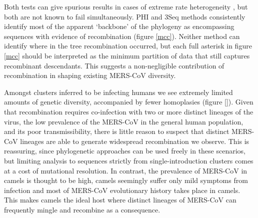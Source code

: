 \documentclass[11pt,oneside,letterpaper]{article}
\begin{document}
Both tests can give spurious results in cases of extreme rate heterogeneity \citep{dudas_mers-cov_2016}, but both are not known to fail simultaneously.
PHI and 3Seq methods consistently identify most of the apparent `backbone' of the phylogeny as encompassing sequences with evidence of recombination (figure \ref{mcc}).
Neither method can identify where in the tree recombination occurred, but each full asterisk in figure \ref{mcc} should be interpreted as the minimum partition of data that still captures recombinant descendants.
This suggests a non-negligible contribution of recombination in shaping existing MERS-CoV diversity.

Amongst clusters inferred to be infecting humans we see extremely limited amounts of genetic diversity, accompanied by fewer homoplasies (figure \ref{}).
Given that recombination requires co-infection with two or more distinct lineages of the virus, the low prevalence of the MERS-CoV in the general human population, and its poor transmissibility, there is little reason to suspect that distinct MERS-CoV lineages are able to generate widespread recombination we observe.
This is reassuring, since phylogenetic approaches can be used freely in these scenarios, but limiting analysis to sequences strictly from single-introduction clusters comes at a cost of mutational resolution.
In contrast, the prevalence of MERS-CoV in camels is thought to be high, camels seemingly suffer only mild symptoms from infection and most of MERS-CoV evolutionary history takes place in camels.
This makes camels the ideal host where distinct lineages of MERS-CoV can frequently mingle and recombine as a consequence.


%
\end{document}
